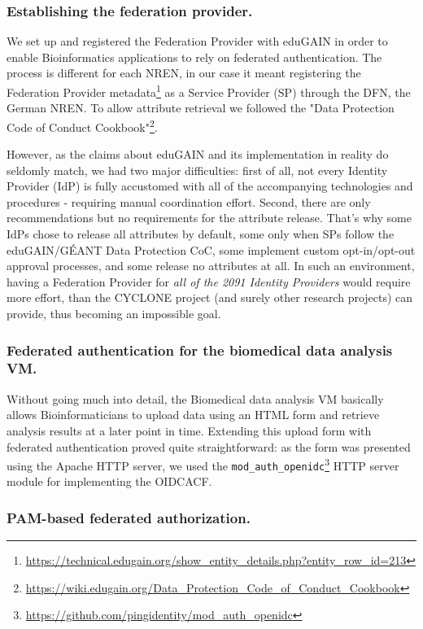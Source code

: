 \documentclass{llncs}
\begin{document}
\subsubsection{Establishing the federation provider.}

We set up and registered the Federation Provider with eduGAIN in order to enable Bioinformatics applications to rely on federated authentication. The process is different for each NREN, in our case it meant registering the Federation Provider metadata\footnote{\url{https://technical.edugain.org/show\_entity\_details.php?entity\_row\_id=213}} as a Service Provider (SP) through the DFN, the German NREN. To allow attribute retrieval we followed the "Data Protection Code of Conduct Cookbook"\footnote{\url{https://wiki.edugain.org/Data\_Protection\_Code\_of\_Conduct\_Cookbook}}.

However, as the claims about eduGAIN and its implementation in reality do seldomly match, we had two major difficulties: first of all, not every Identity Provider (IdP) is fully accustomed with all of the accompanying technologies and procedures - requiring manual coordination effort. Second, there are only recommendations but no requirements for the attribute release. That's why some IdPs chose to release all attributes by default, some only when SPs follow the eduGAIN/GÉANT Data Protection CoC, some implement custom opt-in/opt-out approval processes, and some release no attributes at all. In such an environment, having a Federation Provider for \textit{all of the 2091 Identity Providers} would require more effort, than the CYCLONE project (and surely other research projects) can provide, thus becoming an impossible goal.

\subsubsection{Federated authentication for the biomedical data analysis VM.}

Without going much into detail, the Biomedical data analysis VM basically allows Bioinformaticians to upload data using an HTML form and retrieve analysis results at a later point in time. Extending this upload form with federated authentication proved quite straightforward: as the form was presented using the Apache HTTP server, we used the \texttt{mod\_auth\_openidc}\footnote{\url{https://github.com/pingidentity/mod\_auth\_openidc}} HTTP server module for implementing the OIDCACF.

\subsubsection{PAM-based federated authorization.}
\end{document}
